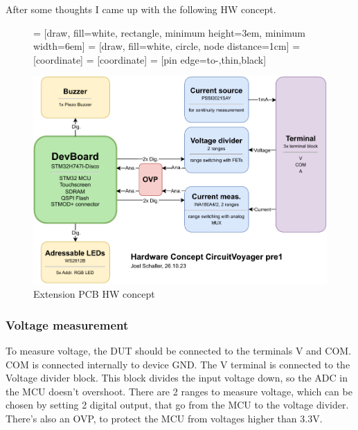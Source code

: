 After some thoughts I came up with the following HW concept.


\begin{figure}[H]
	\centering



     = [draw, fill=white, rectangle, 
    minimum height=3em, minimum width=6em]
     = [draw, fill=white, circle, node distance=1cm]
     = [coordinate]
     = [coordinate]
     = [pin edge={to-,thin,black}]

    \includegraphics[width=15cm]{../../2_Project_Planning/HW_Concept/Hardware_Concept_CircuitVoyager_pre1.pdf}

    \vspace{0.2cm}

	\caption{Extension PCB HW concept}
	\label{fig:Extension PCB HW concept}
\end{figure}

\subsubsection{Voltage measurement}
To measure voltage, the DUT should be connected to the terminals V and COM. COM is connected internally to device GND. The V terminal is connected to the Voltage divider block. This block divides the input voltage down, so the ADC in the MCU doesn't overshoot. There are 2 ranges to measure voltage, which can be chosen by setting 2 digital output, that go from the MCU to the voltage divider. There's also an OVP, to protect the MCU from voltages higher than 3.3V. \cite{DMM_Video_ElectroNoobs}

